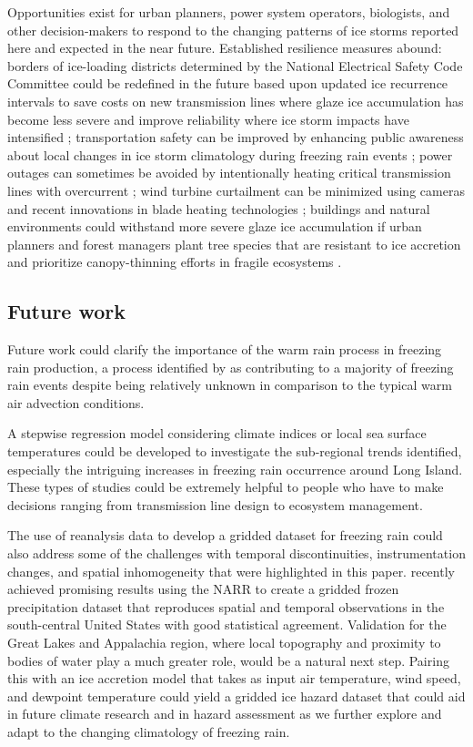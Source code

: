\documentclass[twocol]{ametsoc}
\begin{document}
Opportunities exist for urban planners, power system operators, biologists, and other decision-makers to respond to the changing patterns of ice storms reported here and expected in the near future. Established resilience measures abound: borders of ice-loading districts determined by the National Electrical Safety Code Committee could be redefined in the future based upon updated ice recurrence intervals to save costs on new transmission lines where glaze ice accumulation has become less severe and improve reliability where ice storm impacts have intensified \citep{american2013minimum}; transportation safety can be improved by enhancing public awareness about local changes in ice storm climatology during freezing rain events \citep{call2009assessment}; power outages can sometimes be avoided by intentionally heating critical transmission lines with overcurrent \citep{bendel1981review,huneault2005combined}; wind turbine curtailment can be minimized using cameras and recent innovations in blade heating technologies \citep{bird2014wind}; buildings and natural environments could withstand more severe glaze ice accumulation if urban planners and forest managers plant tree species that are resistant to ice accretion and prioritize canopy-thinning efforts in fragile ecosystems \citep{hauer2006trees}.

\subsection{Future work}
Future work could clarify the importance of the warm rain process in freezing rain production, a process identified by \citet{rauber2000relative} as contributing to a majority of freezing rain events despite being relatively unknown in comparison to the typical warm air advection conditions. 

A stepwise regression model considering climate indices or local sea surface temperatures could be developed to investigate the sub-regional trends identified, especially the intriguing increases in freezing rain occurrence around Long Island. These types of studies could be extremely helpful to people who have to make decisions ranging from transmission line design to ecosystem management.

The use of reanalysis data to develop a gridded dataset for freezing rain could also address some of the challenges with temporal discontinuities, instrumentation changes, and spatial inhomogeneity that were highlighted in this paper. \citet{mullens2017multialgorithm} recently achieved promising results using the NARR to create a gridded frozen precipitation dataset that reproduces spatial and temporal observations in the south-central United States with good statistical agreement. Validation for the Great Lakes and Appalachia region, where local topography and proximity to bodies of water play a much greater role, would be a natural next step. Pairing this with an ice accretion model that takes as input air temperature, wind speed, and dewpoint temperature could yield a gridded ice hazard dataset that could aid in future climate research and in hazard assessment as we further explore and adapt to the changing climatology of freezing rain.
\end{document}

